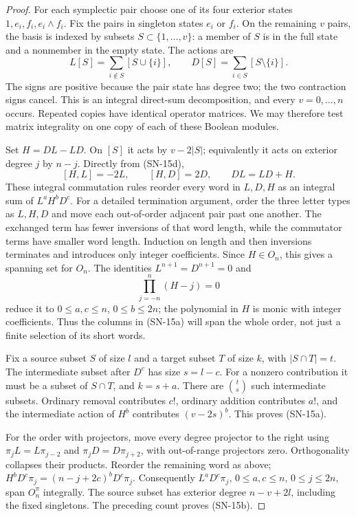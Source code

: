 \documentclass[11pt,a4paper]{article}
\theoremstyle{definition}
\theoremstyle{remark}
\begin{document}
\begin{proof}
For each symplectic pair choose one of its four exterior states
$1,e_i,f_i,e_i\wedge f_i$. Fix the pairs in singleton states
$e_i$ or $f_i$. On the remaining $v$ pairs, the basis is indexed
by subsets $S\subset\{1,\ldots,v\}$: a member of $S$ is in the
full state and a nonmember in the empty state. The actions are
\[
 L[S]=\sum_{i\notin S}[S\cup\{i\}],\qquad
 D[S]=\sum_{i\in S}[S\setminus\{i\}].             \tag{SN-15d}
\]
The signs are positive because the pair state has degree two;
the two contraction signs cancel. This is an integral direct-sum
decomposition, and every $v=0,\ldots,n$ occurs. Repeated copies
have identical operator matrices. We may therefore test matrix
integrality on one copy of each of these Boolean modules.

Set $H=DL-LD$. On $[S]$ it acts by $v-2|S|$; equivalently it
acts on exterior degree $j$ by $n-j$. Directly from (SN-15d),
\[
 [H,L]=-2L,\qquad [H,D]=2D,\qquad DL=LD+H.
\]
These integral commutation rules reorder every word in $L,D,H$
as an integral sum of $L^aH^bD^c$. For a detailed termination
argument, order the three letter types as $L,H,D$ and move each
out-of-order adjacent pair past one another. The exchanged term
has fewer inversions of that word length, while the commutator
terms have smaller word length. Induction on length and then
inversions terminates and introduces only integer coefficients.
Since $H\in O_n$, this gives a spanning set for $O_n$.
The identities $L^{n+1}=D^{n+1}=0$ and
\[
 \prod_{j=-n}^{n}(H-j)=0
\]
reduce it to $0\le a,c\le n$, $0\le b\le2n$; the polynomial
in $H$ is monic with integer coefficients. Thus the columns in
(SN-15a) will span the whole order, not just a finite selection
of its short words.

Fix a source subset $S$ of size $l$ and a target subset $T$ of
size $k$, with $|S\cap T|=t$. The intermediate subset after
$D^c$ has size $s=l-c$. For a nonzero contribution it must be a
subset of $S\cap T$, and $k=s+a$. There are $\binom ts$ such
intermediate subsets. Ordinary removal contributes $c!$, ordinary
addition contributes $a!$, and the intermediate action of $H^b$
contributes $(v-2s)^b$. This proves (SN-15a).

For the order with projectors, move every degree projector to
the right using $\pi_jL=L\pi_{j-2}$ and
$\pi_jD=D\pi_{j+2}$, with out-of-range projectors zero.
Orthogonality collapses their products. Reorder the remaining
word as above; $H^bD^c\pi_j=(n-j+2c)^bD^c\pi_j$.
Consequently $L^aD^c\pi_j$, $0\le a,c\le n$,
$0\le j\le2n$, span $O_n^\pi$ integrally. The source subset
has exterior degree $n-v+2l$, including the fixed singletons.
The preceding count proves (SN-15b).


\end{proof}
\end{document}
